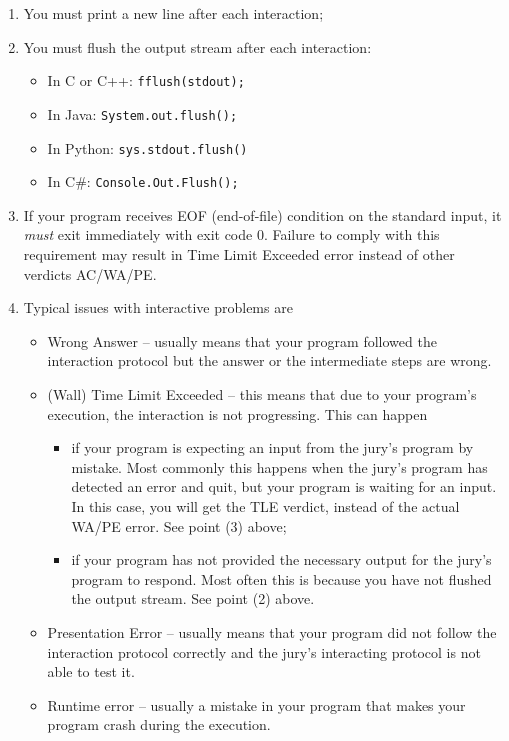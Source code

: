 \begin{enumerate}
    \item You must print a new line after each interaction;
    \item You must flush the output stream after each interaction:
    \begin{itemize}
        \item In C or C++: \texttt{fflush(stdout);}
        \item In Java: \texttt{System.out.flush();}
        \item In Python: \texttt{sys.stdout.flush()}
        \item In C\#: \texttt{Console.Out.Flush();}
    \end{itemize}
    
    \item If your program receives EOF (end-of-file) condition on the standard input, it \emph{must} exit immediately with exit code 0.
    Failure to comply with this requirement may result in Time Limit Exceeded error instead of other verdicts AC/WA/PE.
    
    \item Typical issues with interactive problems are
    \begin{itemize}
        \item Wrong Answer -- usually means that your program followed the interaction protocol but the answer or the intermediate steps are wrong.
        
        \item (Wall) Time Limit Exceeded -- this means that due to your program's execution, the interaction is not progressing.
        This can happen 
        \begin{itemize}
            \item if your program is expecting an input from the jury’s program by mistake.
            Most commonly this happens when the jury's program has detected an error and quit, but your program is waiting for an input.
            In this case, you will get the TLE verdict, instead of the actual WA/PE error.
            See point (3) above;
            \item if your program has not provided the necessary output for the jury’s program to respond.
            Most often this is because you have not flushed the output stream.
            See point (2) above.
        \end{itemize}
        
        \item Presentation Error -- usually means that your program did not follow the interaction protocol correctly and the jury’s interacting protocol is not able to test it.
        
        \item Runtime error -- usually a mistake in your program that makes your program crash during the execution.
    \end{itemize}
\end{enumerate}
